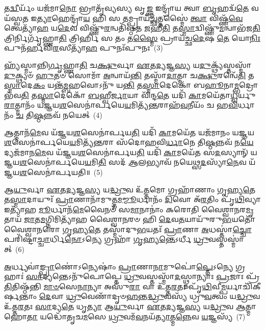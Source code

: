 𑌤\-\ul{𑌦𑍍𑌵𑍀}\-𑌰𑍍𑌯𑌂᳴ 𑌯𑌜᳴𑌮𑌾\-\ul{𑌨𑍋} 𑌭𑍍𑌰𑌾𑌤𑍃᳴𑌵𑍍𑌯𑌸𑍍𑌯 𑌵𑍃\-\ul{𑌙𑍍𑌕𑍍𑌤} 𑌇𑌨𑍍𑌦𑍍𑌰𑌾᳴𑌯 𑌤𑍍𑌵𑌾 \ul{𑌬𑍃}\-𑌹𑌦𑍍𑌵᳴\-\ul{𑌤𑍇} 𑌵𑌯᳴𑌸𑍍𑌵\-\ul{𑌤} 𑌇\-\ul{𑌤𑍍𑌯𑌾}\-𑌹𑍇𑌨𑍍𑌦𑍍𑌰𑌾᳴\-\ul{𑌯} 𑌹𑌿 𑌸 𑌤𑌮𑍍𑌪𑍍𑌰𑌾𑌯᳴\-\ul{𑌚𑍍𑌛}\-𑌤𑍍𑌤𑌸𑍍𑌮𑍈॑ \ul{𑌤𑍍𑌵𑌾} 𑌵𑌿𑌷𑍍𑌣᳴\-\ul{𑌵𑍇} 𑌤𑍍𑌵𑍇𑌤𑍍𑌯𑌾᳴\-\ul{𑌹} 𑌯\-\ul{𑌦𑍇}\-𑌵 𑌵𑌿𑌷𑍍𑌣𑍁᳴\-\ul{𑌰}\-𑌨𑍍𑌵𑌤𑌿᳴𑌷𑍍𑌠𑌤 \ul{𑌜}\-𑌹𑍀\-\ul{𑌤𑌿} 𑌤\-\ul{𑌸𑍍𑌮𑌾}\-𑌦𑍍𑌵𑌿𑌷𑍍𑌣𑍁᳴\-\ul{𑌮}\-𑌨𑍍𑌵𑌾𑌭᳴𑌜\-\ul{𑌤𑌿} 𑌤𑍍𑌰𑌿𑌰𑍍𑌨𑌿𑌰𑍍𑌗𑍃᳴𑌹𑍍𑌣𑌾\-\ul{𑌤𑌿} 𑌤𑍍𑌰𑌿𑌰𑍍\mbox{}𑌹𑌿 𑌸 𑌤𑌂 𑌤\-\ul{𑌸𑍍𑌮𑍈} 𑌪𑍍𑌰𑌾𑌯᳴𑌚𑍍𑌛\-\ul{𑌦𑍇}\-𑌷 \ul{𑌤𑍇} 𑌯𑍋\-\ul{𑌨𑌿𑌃} 𑌪𑍁𑌨᳴𑌰𑍍\mbox{}𑌹𑌵𑌿\-\ul{𑌰}\-𑌸𑍀𑌤𑍍𑌯𑌾᳴\-\ul{𑌹} 𑌪𑍁𑌨𑌃᳴𑌪𑍁𑌨𑌃~(3)

𑌹𑍍𑌯᳴𑌸𑍍𑌮𑌾𑌨𑍍𑌨𑌿\-\ul{𑌰𑍍𑌗𑍃}\-𑌹𑍍𑌣𑌾\-\ul{𑌤𑌿} 𑌚\-\ul{𑌕𑍍𑌷𑍁}\-𑌰𑍍𑌵𑌾 \ul{𑌏}\-𑌤\-\ul{𑌦𑍍𑌯}\-𑌜𑍍𑌞\-\ul{𑌸𑍍𑌯} 𑌯\-\ul{𑌦𑍁}\-𑌕𑍍𑌥𑍍𑌯᳴𑌸𑍍𑌤𑌸𑍍𑌮𑌾᳴\-\ul{𑌦𑍁}\-𑌕𑍍𑌥𑍍𑌯𑍞᳴ \ul{𑌹𑍁}\-𑌤𑍞 𑌸𑍋𑌮𑌾᳴ \ul{𑌅}\-𑌨𑍍𑌵𑌾𑌯᳴\-\ul{𑌨𑍍𑌤𑌿} 𑌤𑌸𑍍𑌮𑌾᳴\-\ul{𑌦𑌾}\-𑌤𑍍𑌮𑌾 𑌚\-\ul{𑌕𑍍𑌷𑍁}\-𑌰𑌨𑍍𑌵𑍇᳴\-\ul{𑌤𑌿} 𑌤\-\ul{𑌸𑍍𑌮𑌾}\-𑌦𑍇\-\ul{𑌕𑌂} 𑌯𑌨𑍍𑌤᳴\-\ul{𑌮𑍍𑌬}\-𑌹𑌵𑍋\-𑌽𑌨𑍁᳴ 𑌯\-\ul{𑌨𑍍𑌤𑌿} 𑌤\-\ul{𑌸𑍍𑌮𑌾}\-𑌦𑍇𑌕𑍋᳴ 𑌬\-\ul{𑌹𑍂}\-𑌨𑌾\-\ul{𑌮𑍍𑌭}\-𑌦𑍍𑌰𑍋 𑌭᳴𑌵\-\ul{𑌤𑌿} 𑌤\-\ul{𑌸𑍍𑌮𑌾}\-𑌦𑍇𑌕𑍋᳴ \ul{𑌬}\-𑌹𑍍𑌵𑍀\-\ul{𑌰𑍍𑌜𑌾}\-𑌯𑌾 𑌵𑌿᳴𑌨𑍍𑌦\-\ul{𑌤𑍇} 𑌯𑌦𑌿᳴ \ul{𑌕𑌾}\-𑌮𑌯𑍇᳴𑌤𑌾\-\ul{𑌧𑍍𑌵}\-𑌰𑍍𑌯𑍁\-\ul{𑌰𑌾}\-𑌤𑍍𑌮𑌾𑌨𑌂᳴ 𑌯𑌜𑍍𑌞𑌯\-\ul{𑌶}\-𑌸𑍇𑌨𑌾॑𑌰𑍍𑌪𑌯𑍇\-\ul{𑌯}\-𑌮𑌿𑌤𑍍𑌯᳴\-\ul{𑌨𑍍𑌤}\-𑌰𑌾𑌹᳴\-\ul{𑌵}\-𑌨𑍀𑌯𑌂᳴ 𑌚 𑌹\-\ul{𑌵𑌿}\-𑌰𑍍𑌧𑌾𑌨𑌂᳴ \ul{𑌚} 𑌤𑌿\-\ul{𑌷𑍍𑌠}\-𑌨𑍍𑌨𑌵᳴ 𑌨𑌯𑍇𑌤𑍍~(4)

\-\ul{𑌆}\-𑌤𑍍𑌮𑌾𑌨᳴\-\ul{𑌮𑍇}\-𑌵 𑌯᳴𑌜𑍍𑌞𑌯\-\ul{𑌶}\-𑌸𑍇𑌨𑌾॑𑌰𑍍𑌪𑌯\-\ul{𑌤𑌿} 𑌯𑌦𑌿᳴ \ul{𑌕𑌾}\-𑌮𑌯𑍇᳴\-\ul{𑌤} 𑌯𑌜᳴𑌮𑌾𑌨𑌂 𑌯𑌜𑍍𑌞𑌯\-\ul{𑌶}\-𑌸𑍇𑌨𑌾॑𑌰𑍍𑌪𑌯𑍇\-\ul{𑌯}\-𑌮𑌿𑌤𑍍𑌯᳴\-\ul{𑌨𑍍𑌤}\-𑌰𑌾 𑌸᳴𑌦𑍋𑌹𑌵𑌿\-\ul{𑌰𑍍𑌧𑌾}\-𑌨𑍇 𑌤𑌿\-\ul{𑌷𑍍𑌠}\-𑌨𑍍𑌨𑌵᳴ 𑌨\-\ul{𑌯𑍇}\-𑌦𑍍𑌯𑌜᳴𑌮𑌾𑌨\-\ul{𑌮𑍇}\-𑌵 𑌯᳴𑌜𑍍𑌞𑌯\-\ul{𑌶}\-𑌸𑍇𑌨𑌾॑𑌰𑍍𑌪𑌯\-\ul{𑌤𑌿} 𑌯𑌦𑌿᳴ \ul{𑌕𑌾}\-𑌮𑌯𑍇᳴𑌤 𑌸\-\ul{𑌦}\-𑌸𑍍𑌯𑌾𑌨𑍍᳴ 𑌯𑌜𑍍𑌞𑌯\-\ul{𑌶}\-𑌸𑍇𑌨𑌾॑𑌰𑍍𑌪𑌯𑍇\-\ul{𑌯}\-𑌮𑌿\-\ul{𑌤𑌿} 𑌸𑌦᳴ \ul{𑌆}\-𑌲𑌭𑍍𑌯𑌾𑌵᳴ 𑌨𑌯𑍇𑌥𑍍𑌸\-\ul{𑌦}\-𑌸𑍍𑌯𑌾᳴\-\ul{𑌨𑍇}\-𑌵 𑌯᳴𑌜𑍍𑌞𑌯\-\ul{𑌶}\-𑌸𑍇𑌨𑌾॑𑌰𑍍𑌪𑌯𑌤𑌿॥~(5)

{\anuvakamend[{𑌇𑌤𑍀॑\-\ul{𑌨𑍍𑌦𑍍𑌰𑌿}\-𑌯\-\ul{𑌮𑍇}\-𑌵 𑌪𑍁𑌨𑌃᳴𑌪𑍁𑌨𑌰𑍍𑌨\-\ul{𑌯𑍇}\-𑌤𑍍𑌤𑍍𑌰𑌯᳴𑌸𑍍𑌤𑍍𑌰𑌿𑍞𑌶𑌚𑍍𑌚}]}%

𑌆\-\ul{𑌯𑍁}\-𑌰𑍍𑌵𑌾 \ul{𑌏}\-𑌤\-\ul{𑌦𑍍𑌯}\-𑌜𑍍𑌞\-\ul{𑌸𑍍𑌯} 𑌯\-\ul{𑌦𑍍𑌧𑍍𑌰𑍁}\-𑌵 𑌉᳴\-\ul{𑌤𑍍𑌤}\-𑌮𑍋 𑌗𑍍𑌰𑌹𑌾᳴𑌣𑌾𑌂 𑌗𑍃𑌹𑍍𑌯\-\ul{𑌤𑍇} 𑌤\-\ul{𑌸𑍍𑌮𑌾}\-𑌦𑌾𑌯𑍁𑌃᳴ \ul{𑌪𑍍𑌰𑌾}\-𑌣𑌾𑌨𑌾᳴𑌮𑍁\-\ul{𑌤𑍍𑌤}\-𑌮\-\ul{𑌮𑍍𑌮𑍂}\-𑌰𑍍𑌧𑌾𑌨𑌂᳴ \ul{𑌦𑌿}\-𑌵𑍋 𑌅᳴\-\ul{𑌰}\-𑌤𑌿𑌂 𑌪𑍃᳴\-\ul{𑌥𑌿}\-𑌵𑍍𑌯𑌾 𑌇𑌤𑍍𑌯𑌾᳴𑌹 \ul{𑌮𑍂}\-𑌰𑍍𑌧𑌾𑌨᳴\-\ul{𑌮𑍇}\-𑌵𑍈𑌨𑍞᳴ 𑌸\-\ul{𑌮𑌾}\-𑌨𑌾𑌨𑌾𑌂॑ 𑌕𑌰𑍋𑌤𑌿 𑌵𑍈𑌶𑍍𑌵𑌾\-\ul{𑌨}\-𑌰\-\ul{𑌮𑍃}\-𑌤𑌾𑌯᳴ \ul{𑌜𑌾}\-𑌤\-\ul{𑌮}\-𑌗𑍍𑌨𑌿𑌮𑌿𑌤𑍍𑌯𑌾᳴𑌹 𑌵𑍈𑌶𑍍𑌵𑌾\-\ul{𑌨}\-𑌰𑍞 𑌹𑌿 \ul{𑌦𑍇}\-𑌵\-\ul{𑌤}\-𑌯𑌾𑌯𑍁᳴𑌰𑍁\-\ul{𑌭}\-𑌯𑌤𑍋᳴𑌵𑍈𑌶𑍍𑌵𑌾𑌨𑌰𑍋 𑌗𑍃𑌹𑍍𑌯\-\ul{𑌤𑍇} 𑌤𑌸𑍍𑌮𑌾᳴𑌦𑍁\-\ul{𑌭}\-𑌯𑌤𑌃᳴ \ul{𑌪𑍍𑌰𑌾}\-𑌣𑌾 \ul{𑌅}\-𑌧𑌸𑍍𑌤𑌾॑\-\ul{𑌚𑍍𑌚𑍋}\-𑌪𑌰𑌿᳴𑌷𑍍𑌟𑌾\-\ul{𑌚𑍍𑌚𑌾}\-𑌰𑍍𑌧𑌿\-\ul{𑌨𑍋}\-\-𑌽𑌨𑍍𑌯𑍇 𑌗𑍍𑌰𑌹𑌾᳴ \ul{𑌗𑍃}\-𑌹𑍍𑌯\-\ul{𑌨𑍍𑌤𑍇}\-\-𑌽𑌰𑍍𑌧𑍀 \ul{𑌧𑍍𑌰𑍁}\-𑌵𑌸𑍍𑌤𑌸𑍍𑌮𑌾॑𑌤𑍍~(6)

\-\ul{𑌅}\-𑌰𑍍𑌧𑍍𑌯𑌵𑌾॑\-\ul{𑌙𑍍𑌪𑍍𑌰𑌾}\-𑌣𑍋॑\-𑌽𑌨𑍍𑌯𑍇𑌷𑌾𑌂॑ \ul{𑌪𑍍𑌰𑌾}\-𑌣𑌾\-\ul{𑌨𑌾}\-𑌮𑍁𑌪𑍋॑\-\ul{𑌪𑍍𑌤𑍇}\-\-𑌽𑌨𑍍𑌯𑍇 𑌗𑍍𑌰𑌹𑌾𑌃॑ \ul{𑌸𑌾}\-𑌦𑍍𑌯𑌨𑍍𑌤𑍇\-𑌽𑌨𑍁᳴𑌪𑍋𑌪𑍍𑌤𑍇 \ul{𑌧𑍍𑌰𑍁}\-𑌵𑌸𑍍𑌤𑌸𑍍𑌮𑌾᳴\-\ul{𑌦}\-𑌸𑍍𑌥𑍍𑌨𑌾𑌨𑍍𑌯𑌾𑌃 \ul{𑌪𑍍𑌰}\-𑌜𑌾𑌃 𑌪𑍍𑌰᳴\-\ul{𑌤𑌿}\-𑌤𑌿𑌷𑍍𑌠᳴𑌨𑍍𑌤𑌿 \ul{𑌮𑌾}\-\-\ul{𑍞}\-𑌸𑍇\-\ul{𑌨𑌾}\-𑌨𑍍𑌯𑌾 𑌅𑌸𑍁᳴\-\ul{𑌰𑌾} 𑌵𑌾 𑌉᳴𑌤𑍍𑌤\-\ul{𑌰}\-𑌤𑌃 𑌪𑍃᳴\-\ul{𑌥𑌿}\-𑌵𑍀\-\ul{𑌮𑍍𑌪}\-𑌰𑍍𑌯𑌾𑌚𑌿᳴𑌕𑍀𑌰𑍍\mbox{}\-\ul{𑌷}\-𑌨𑍍𑌤𑌾𑌂 \ul{𑌦𑍇}\-𑌵𑌾 \ul{𑌧𑍍𑌰𑍁}\-𑌵𑍇𑌣𑌾᳴𑌦𑍃𑍞\-\ul{𑌹}\-𑌨𑍍𑌤\-\ul{𑌦𑍍𑌧𑍍𑌰𑍁}\-𑌵𑌸𑍍𑌯᳴ 𑌧𑍍𑌰𑍁\-\ul{𑌵}\-𑌤𑍍𑌵𑌂 𑌯\-\ul{𑌦𑍍𑌧𑍍𑌰𑍁}\-𑌵 𑌉᳴𑌤𑍍𑌤\-\ul{𑌰}\-𑌤𑌃 \ul{𑌸𑌾}\-𑌦𑍍𑌯\-\ul{𑌤𑍇} 𑌧𑍃\-\ul{𑌤𑍍𑌯𑌾} 𑌆\-\ul{𑌯𑍁}\-𑌰𑍍𑌵𑌾 \ul{𑌏}\-𑌤\-\ul{𑌦𑍍𑌯}\-𑌜𑍍𑌞\-\ul{𑌸𑍍𑌯} 𑌯\-\ul{𑌦𑍍𑌧𑍍𑌰𑍁}\-𑌵 \ul{𑌆}\-𑌤𑍍𑌮𑌾 𑌹𑍋\-\ul{𑌤𑌾} 𑌯𑌦𑍍𑌧𑍋᳴𑌤𑍃𑌚\-\ul{𑌮}\-𑌸𑍇 \ul{𑌧𑍍𑌰𑍁}\-𑌵𑌮᳴\-\ul{𑌵}\-𑌨𑌯᳴\-\ul{𑌤𑍍𑌯𑌾}\-𑌤𑍍𑌮\-\ul{𑌨𑍍𑌨𑍇}\-𑌵 \ul{𑌯}\-𑌜𑍍𑌞𑌸𑍍𑌯᳴~(7)

